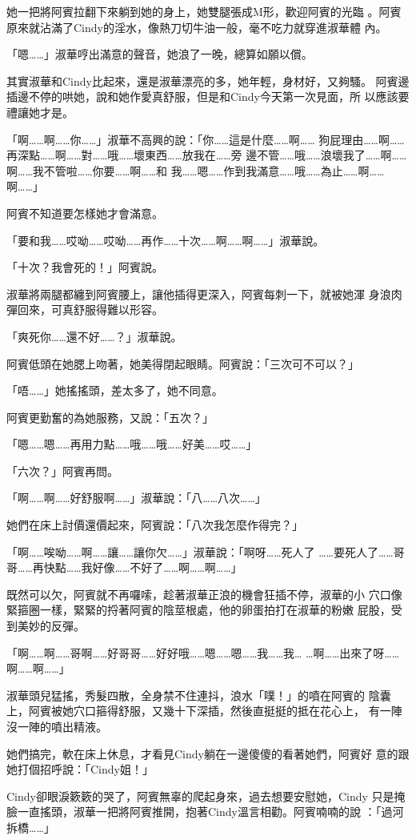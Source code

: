 她一把將阿賓拉翻下來躺到她的身上，她雙腿張成M形，歡迎阿賓的光臨
。阿賓原來就沾滿了Cindy的淫水，像熱刀切牛油一般，毫不吃力就穿進淑華體
內。

「嗯……」淑華哼出滿意的聲音，她浪了一晚，總算如願以償。

其實淑華和Cindy比起來，還是淑華漂亮的多，她年輕，身材好，又夠騷。
阿賓邊插邊不停的哄她，說和她作愛真舒服，但是和Cindy今天第一次見面，所
以應該要禮讓她才是。

「啊……啊……你……」淑華不高興的說：「你……這是什麼……啊……
狗屁理由……啊……再深點……啊……對……哦……壞東西……放我在……旁
邊不管……哦……浪壞我了……啊……啊……我不管啦……你要……啊……和
我……嗯……作到我滿意……哦……為止……啊……啊……」

阿賓不知道要怎樣她才會滿意。

「要和我……哎呦……哎呦……再作……十次……啊……啊……」淑華說。

「十次？我會死的！」阿賓說。

淑華將兩腿都纏到阿賓腰上，讓他插得更深入，阿賓每刺一下，就被她渾
身浪肉彈回來，可真舒服得難以形容。

「爽死你……還不好……？」淑華說。

阿賓低頭在她腮上吻著，她美得閉起眼睛。阿賓說：「三次可不可以？」

「唔……」她搖搖頭，差太多了，她不同意。

阿賓更勤奮的為她服務，又說：「五次？」

「嗯……嗯……再用力點……哦……哦……好美……哎……」

「六次？」阿賓再問。

「啊……啊……好舒服啊……」淑華說：「八……八次……」

她們在床上討價還價起來，阿賓說：「八次我怎麼作得完？」

「啊……唉呦……啊……讓……讓你欠……」淑華說：「啊呀……死人了
……要死人了……哥哥……再快點……我好像……不好了……啊……啊……」

既然可以欠，阿賓就不再囉嗦，趁著淑華正浪的機會狂插不停，淑華的小
穴口像緊箍圈一樣，緊緊的捋著阿賓的陰莖根處，他的卵蛋拍打在淑華的粉嫩
屁股，受到美妙的反彈。

「啊……啊……哥啊……好哥哥……好好哦……嗯……嗯……我……我…
…啊……出來了呀……啊……啊……」

淑華頭兒猛搖，秀髮四散，全身禁不住連抖，浪水「噗！」的噴在阿賓的
陰囊上，阿賓被她穴口箍得舒服，又幾十下深插，然後直挺挺的抵在花心上，
有一陣沒一陣的噴出精液。

她們搞完，軟在床上休息，才看見Cindy躺在一邊傻傻的看著她們，阿賓好
意的跟她打個招呼說：「Cindy姐！」

Cindy卻眼淚簌簌的哭了，阿賓無辜的爬起身來，過去想要安慰她，Cindy
只是掩臉一直搖頭，淑華一把將阿賓推開，抱著Cindy溫言相勸。阿賓喃喃的說
：「過河拆橋……」

